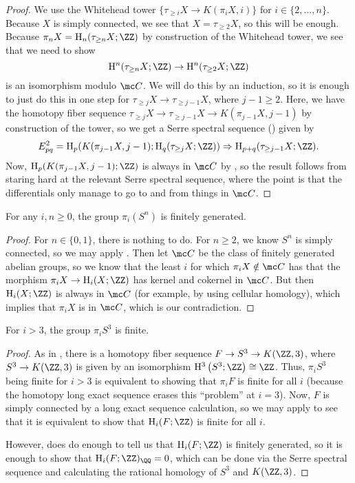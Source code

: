 \documentclass[../notes.tex]{subfiles}
\begin{document}
\begin{proof}
	We use the Whitehead tower $\{\tau_{\ge i}X\to K(\pi_iX,i)\}$ for $i\in\{2,\ldots,n\}$. Because $X$ is simply connected, we see that $X=\tau_{\ge2}X$, so this will be enough. Because $\pi_nX=\mathrm H_n(\tau_{\ge n}X;\ZZ)$ by construction of the Whitehead tower, we see that we need to show
	\[\mathrm H^n(\tau_{\ge n}X;\ZZ)\to\mathrm H^n(\tau_{\ge2}X;\ZZ)\]
	is an isomorphism modulo $\mc C$. We will do this by an induction, so it is enough to just do this in one step for $\tau_{\ge j}X\to\tau_{\ge j-1}X$, where $j-1\ge2$. Here, we have the homotopy fiber sequence $\tau_{\ge j}X\to\tau_{\ge j-1}X\to K(\pi_{j-1}X,j-1)$ by construction of the tower, so we get a Serre spectral sequence () given by
	\[E^2_{pq}=\mathrm H_p(K(\pi_{j-1}X,j-1);\mathrm H_q(\tau_{\ge j}X;\ZZ))\Rightarrow\mathrm H_{p+q}(\tau_{\ge j-1}X;\ZZ).\]
	Now, $\mathrm H_p(K(\pi_{j-1}X,j-1);\ZZ)$ is always in $\mc C$ by , so the result follows from staring hard at the relevant Serre spectral sequence, where the point is that the differentials only manage to go to and from things in $\mc C$.
\end{proof}
\begin{corollary}
	For any $i,n\ge0$, the group $\pi_i(S^n)$ is finitely generated.
\end{corollary}
\begin{proof}
	For $n\in\{0,1\}$, there is nothing to do. For $n\ge2$, we know $S^n$ is simply connected, so we may apply . Then let $\mc C$ be the class of finitely generated abelian groups, so we know that the least $i$ for which $\pi_iX\notin\mc C$ has that the morphism $\pi_iX\to\mathrm H_i(X;\ZZ)$ has kernel and cokernel in $\mc C$. But then $\mathrm H_i(X;\ZZ)$ is always in $\mc C$ (for example, by using cellular homology), which implies that $\pi_iX$ is in $\mc C$, which is our contradiction.
\end{proof}
\begin{corollary}
	For $i>3$, the group $\pi_iS^3$ is finite.
\end{corollary}
\begin{proof}
	As in , there is a homotopy fiber sequence $F\to S^3\to K(\ZZ,3)$, where $S^3\to K(\ZZ,3)$ is given by an isomorphism $\mathrm H^3\left(S^3;\ZZ\right)\cong\ZZ$. Thus, $\pi_iS^3$ being finite for $i>3$ is equivalent to showing that $\pi_iF$ is finite for all $i$ (because the homotopy long exact sequence erases this ``problem'' at $i=3$). Now, $F$ is simply connected by a long exact sequence calculation, so we may apply  to see that it is equivalent to show that $\mathrm H_i(F;\ZZ)$ is finite for all $i$.

	However,  does do enough to tell us that $\mathrm H_i(F;\ZZ)$ is finitely generated, so it is enough to show that $\mathrm H_i(F;\ZZ)_\QQ=0$, which can be done via the Serre spectral sequence and calculating the rational homology of $S^3$ and $K(\ZZ,3)$.
\end{proof}
\end{document}
